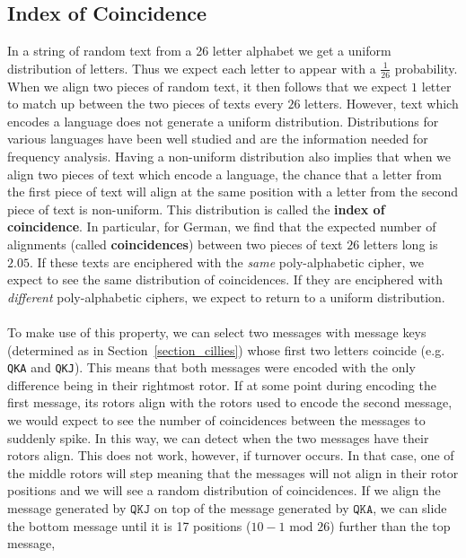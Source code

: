 \subsection{Index of Coincidence}\label{ioc}
In a string of random text from a 26 letter alphabet we get a uniform
distribution of letters. Thus we expect each letter to appear with a
$\frac{1}{26}$ probability. When we align two pieces of random text,
it then follows that we expect $1$ letter to match up between the two
pieces of texts
every $26$ letters. However, text which encodes a language does
not generate a uniform distribution. Distributions for various
languages have been well studied and are the information needed for
frequency analysis. Having a non-uniform distribution also implies
that when we align two pieces of text which encode a language, the
chance that a letter from the first piece of text will align at the
same position with a letter
from the second piece of text is non-uniform. This distribution is
called the {\bf{index of coincidence}}. In particular, for German, we
find that the expected number of alignments (called
{\bf{coincidences}}) between two pieces of text $26$ letters long is
$2.05$. If these texts
are enciphered with the \emph{same} poly-alphabetic cipher, we expect
to see the same distribution of coincidences. If they are enciphered
with \emph{different} poly-alphabetic ciphers, we expect to return to
a uniform distribution.
\\\\To make use of this property, we can select two messages with
message keys (determined as in Section~\ref{section_cillies}) whose first two
letters coincide (e.g. \texttt{QKA} and
\texttt{QKJ}). This means that both messages were encoded with the
only difference being in their rightmost rotor. If at some point
during encoding the first message, its rotors align with the rotors
used to encode the second message, we would expect to see the number
of coincidences between the messages to suddenly spike.
In this way, we can detect when the two messages have their rotors
align. This does not work, however, if turnover occurs. In that case,
one of the middle rotors will step meaning that the
messages will not align in their rotor positions and we will see a
random distribution of coincidences. If we align the message
generated by $\texttt{QKJ}$ on top of the message generated by
$\texttt{QKA}$, we can slide the bottom message until it is 17
positions ($10-1 \text{ mod } 26$)
further than the top message,

